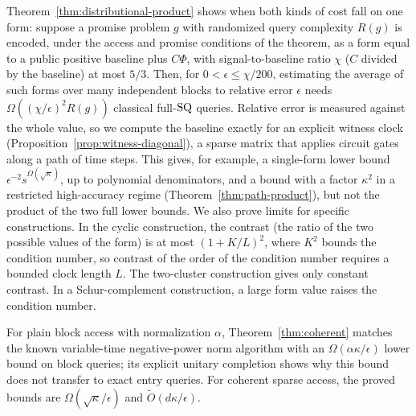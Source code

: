 Theorem~\ref{thm:distributional-product} shows when both kinds of cost
fall on one form: suppose a promise problem $g$ with randomized query
complexity $R(g)$ is encoded, under the access and promise conditions of the theorem, as
a form equal to a public positive baseline plus $C\Phi$, with
signal-to-baseline ratio $\chi$ ($C$ divided by the baseline) at most $5/3$. Then, for $0<\epsilon\leq\chi/200$, estimating the
average of such forms over many independent blocks to relative error
$\epsilon$ needs $\Omega((\chi/\epsilon)^2R(g))$ classical full-$\mathrm{SQ}$
queries. Relative error is measured against the whole value, so we
compute the baseline exactly for an explicit witness clock
(Proposition~\ref{prop:witness-diagonal}), a sparse matrix that applies
circuit gates along a path of time steps. This gives, for example, a
single-form lower bound $\epsilon^{-2}s^{\Omega(\sqrt\kappa)}$, up to
polynomial denominators, and a bound with a factor $\kappa^2$ in a
restricted high-accuracy regime (Theorem~\ref{thm:path-product}), but
not the product of the two full lower bounds. We also prove limits for
specific constructions. In the cyclic construction, the contrast (the
ratio of the two possible values of the form) is at most $(1+K/L)^2$,
where $K^2$ bounds the condition number, so contrast of the order of the condition number requires a bounded
clock length $L$. The two-cluster construction gives only constant
contrast. In a Schur-complement construction, a large form value
raises the condition number.

For plain block access with normalization $\alpha$,
Theorem~\ref{thm:coherent} matches the known variable-time negative-power
norm algorithm with an $\Omega(\alpha\kappa/\epsilon)$ lower bound on
block queries; its explicit unitary completion shows why this bound does
not transfer to exact entry queries. For coherent sparse access, the
proved bounds are $\Omega(\sqrt\kappa/\epsilon)$ and
$\widetilde O(d\kappa/\epsilon)$.

